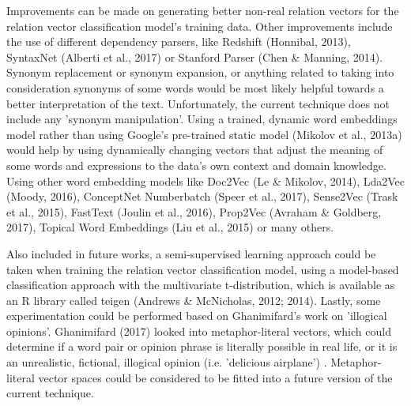 \documentclass{sig-alternate}
\begin{document}
Improvements can be made on generating better non-real relation vectors for the relation vector classification model's training data. Other improvements include the use of different dependency parsers, like Redshift (Honnibal, 2013), SyntaxNet (Alberti et al., 2017) or Stanford Parser (Chen \& Manning, 2014). Synonym replacement or synonym expansion, or anything related to taking into consideration synonyms of some words would be most likely helpful towards a better interpretation of the text. Unfortunately, the current technique does not include any 'synonym manipulation'. Using a trained, dynamic word embeddings model rather than using Google's pre-trained static model (Mikolov et al., 2013a) would help by using dynamically changing vectors that adjust the meaning of some words and expressions to the data's own context and domain knowledge. Using other word embedding models like Doc2Vec (Le \& Mikolov, 2014), Lda2Vec (Moody, 2016), ConceptNet Numberbatch (Speer et al., 2017), Sense2Vec (Trask et al., 2015), FastText (Joulin et al., 2016), Prop2Vec (Avraham \& Goldberg, 2017), Topical Word Embeddings (Liu et al., 2015) or many others.

Also included in future works, a semi-supervised learning approach could be taken when training the relation vector classification model, using a model-based classification approach with the multivariate t-distribution, which is available as an R library called teigen (Andrews \& McNicholas, 2012; 2014). 
Lastly, some experimentation could be performed based on Ghanimifard's work on 'illogical opinions'. Ghanimifard (2017) looked into metaphor-literal vectors, which could determine if a word pair or opinion phrase is literally possible in real life, or it is an unrealistic, fictional, illogical opinion (i.e. 'delicious airplane') . Metaphor-literal vector spaces could be considered to be fitted into a future version of the current technique.
\end{document}
